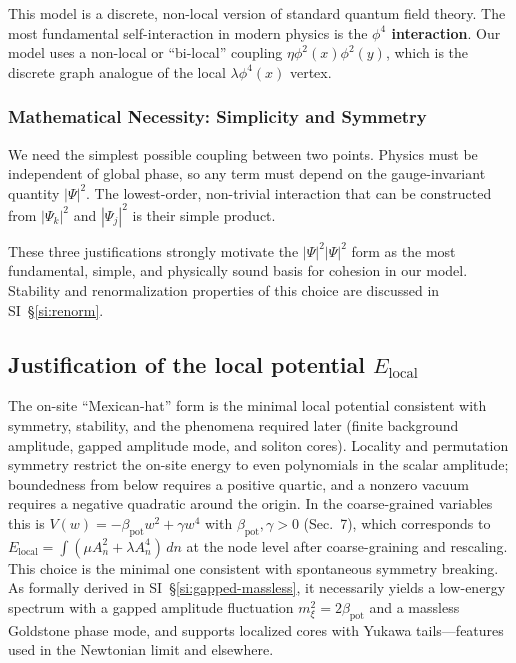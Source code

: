 \documentclass[11pt]{article}
\begin{document}
This model is a discrete, non-local version of standard quantum field theory. The most fundamental self-interaction in modern physics is the \textbf{$\phi^4$ interaction}. Our model uses a non-local or ``bi-local'' coupling $\eta \phi^2(x) \phi^2(y)$, which is the discrete graph analogue of the local $\lambda\phi^4(x)$ vertex.

\subsubsection{Mathematical Necessity: Simplicity and Symmetry}

We need the simplest possible coupling between two points. Physics must be independent of global phase, so any term must depend on the gauge-invariant quantity $|\Psi|^2$. The lowest-order, non-trivial interaction that can be constructed from $|\Psi_k|^2$ and $|\Psi_j|^2$ is their simple product.

These three justifications strongly motivate the $|\Psi|^2|\Psi|^2$ form as the most fundamental, simple, and physically sound basis for cohesion in our model. Stability and renormalization properties of this choice are discussed in SI~\S\ref{si:renorm}.

\subsection{Justification of the local potential $E_{\text{local}}$}

The on-site ``Mexican-hat'' form is the minimal local potential consistent with symmetry, stability, and the phenomena required later (finite background amplitude, gapped amplitude mode, and soliton cores). Locality and permutation symmetry restrict the on-site energy to even polynomials in the scalar amplitude; boundedness from below requires a positive quartic, and a nonzero vacuum requires a negative quadratic around the origin. In the coarse-grained variables this is $V(w)=-\beta_{\mathrm{pot}} w^2+\gamma w^4$ with $\beta_{\mathrm{pot}},\gamma>0$ (Sec.~7), which corresponds to $E_{\text{local}}=\int(\mu A_n^2+\lambda A_n^4)\,dn$ at the node level after coarse-graining and rescaling. This choice is the minimal one consistent with spontaneous symmetry breaking. As formally derived in SI~\S\ref{si:gapped-massless}, it necessarily yields a low-energy spectrum with a gapped amplitude fluctuation $m_\xi^2=2\beta_{\mathrm{pot}}$ and a massless Goldstone phase mode, and supports localized cores with Yukawa tails—features used in the Newtonian limit and elsewhere.
\end{document}
